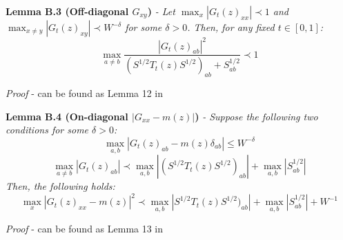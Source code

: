 \documentclass[11pt]{article}
\newenvironment{boxtheorem}[1]
  {\begin{mdframed}\noindent\textbf{#1}\itshape\space}
  {\end{mdframed}}
\begin{document}
\begin{boxtheorem}{Lemma B.3 (Off-diagonal $G_{xy}$)} \label{lemma-b3} - Let $\max_x|G_t(z)_{xx}|\prec 1$ and $\max_{x\neq y}|G_t(z)_{xy}|\prec W^{-\delta}$ for some $\delta>0$. Then, for any fixed $t\in [0, 1]$:$$\max_{a\neq b} \frac{|G_t(z)_{ab}|^2}{(S^{1/2}T_t(z)S^{1/2})_{ab}+S_{ab}^{1/2}}\prec 1$$

\end{boxtheorem}
\textit{Proof} - can be found as Lemma 12 in \cite{bandSDE}\label{lemma-b4}
\begin{boxtheorem}{Lemma B.4 (On-diagonal $|G_{xx}-m(z)|$)} - Suppose the following two conditions for some $\delta>0$:$$\max_{a,b}|G_t(z)_{ab}-m(z)\delta_{ab}|\leq W^{-\delta}$$
$$\max_{a\neq b}|G_t(z)_{ab}|\prec \max_{a, b}|(S^{1/2}T_t(z)S^{1/2})_{ab}|+\max_{a, b}|S_{ab}^{1/2}|$$
Then, the following holds: $$\max_x |G_t(z)_{xx} - m(z)|^2\prec \max_{a, b}|S^{1/2}T_t(z)S^{1/2})_{ab}|+\max_{a,b}|S_{ab}^{1/2}|+W^{-1}$$

\end{boxtheorem}
\textit{Proof} - can be found as Lemma 13 in \cite{bandSDE}

\newpage 
{}
\end{document}
